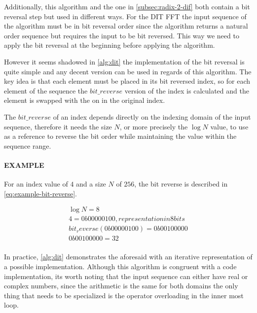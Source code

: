 \documentclass[
  oneside,
  11pt, a4paper,
  footinclude=true,
  headinclude=true,
  cleardoublepage=empty
]{scrbook}
\begin{document}
Additionally, this algorithm and the one in \autoref{subsec:radix-2-dif} both contain a bit reversal step but used in different ways. For the DIT FFT  the input sequence of the algorithm must be in bit reversal order since the algorithm returns a natural order sequence but requires the input to be bit reversed. This way we need to apply the bit reversal at the beginning before applying the algorithm.

However it seems shadowed in \autoref{alg:dit} the implementation of the bit reversal is quite simple and any decent version can be used in regards of this algorithm. The key idea is that each element must be placed in its bit reversed index, so for each element of the sequence the $bit\_reverse$ version of the index is calculated and the element is swapped with the on in the original index.

The $bit\_reverse$ of an index depends directly on the indexing domain of the input sequence, therefore it needs the size $N$, or more precisely the $\log{N}$ value, to use as a reference to reverse the bit order while maintaining the value within the sequence range.

\paragraph{EXAMPLE} For an index value of $4$ and a size $N$ of $256$, the bit reverse is described in \autoref{eq:example-bit-reverse}. \newline

\begin{equation} \label{eq:example-bit-reverse}
    \begin{aligned}
        \log{N} = 8 \\
        4 = 0b00000100, representation in 8 bits  \\
        bit_reverse(0b00000100) = 0b00100000 \\
        0b00100000 = 32 \\
    \end{aligned}
\end{equation}

In practice, \autoref{alg:dit} demonstrates the aforesaid with an iterative representation of a possible implementation. Although this algorithm is congruent with a code implementation, its worth noting that the input sequence can either have real or complex numbers, since the arithmetic is the same for both domains the only thing that needs to be specialized is the operator overloading in the inner most loop. \newline
\newline
\end{document}
